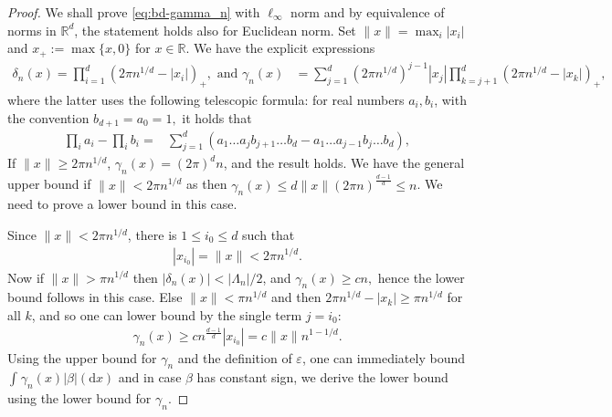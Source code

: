 \documentclass[10pt,a4paper]{amsart}
\newcommand{\R}{\mathbb{R}}
\newcommand{\md}{\mathrm{d}}
\begin{document}
\begin{proof}  {We shall prove \eqref{eq:bd-gamma_n} with $\ell_{\infty}$ norm and by equivalence of norms in $\R^d$, the statement holds also for Euclidean norm. Set $ \|x\| = \max_{i} | x_{i} |$ and $x_+  := \max \{x,0\}$ for $x \in \R$.}
{We have the explicit expressions
%
\begin{align*}
\delta _{n}(x)= \prod_{i= 1}^{d}(2\pi n^{1/d}- | x_{i} | )_{+}, \, \, \text{and} \, \, \gamma _{n}(x)&
 = \sum_{j =  1}^{d}(2\pi n^{ 1/d})^{j- 1} | x_{j} |  \prod_{k = j +  1}^{d}(2\pi n^{ 1/d}- | x_{k} | )_+,
\end{align*}
%
where the latter uses the following telescopic formula: for real numbers $ a_{i},b_{i}$, with the convention $ b_{d +  1} = a_{0} =  1, $ it holds that
%
\begin{align*}  \prod_{i}a_{i}-  \prod_{i}b_{i} = &\sum_{j =   1}^{d}(a_{ 1}\dots a_{j}b_{j +  1 }\dots b_{d}-a_{ 1}\dots a_{j- 1 }b_{j}\dots b_{d}),
\end{align*}
%
}If $ \|x\|\geqslant 2\pi n^{ 1/d}$, $ \gamma  _{n}(x) = (2\pi )^{d}n$, and the result holds. We have the general upper bound if $ \|x\|<2\pi n^{ 1/d}$ as then $ \gamma _{n}(x)\leqslant {d}\|x\|(2\pi n)^{\frac{ d- 1}{d}}\leqslant n$. We need to prove a lower bound in this case.

{Since $ \|x\| < 2\pi n^{ 1/d}$, there is} $1 \leqslant i_{0} \leqslant d$ such that
%
\begin{align*}
|x_{i_{0}}|  = \|x\| <2\pi n^{ 1/d}.
\end{align*}
%
Now if $ \|x\|>\pi n^{ 1/d}$ then $| \delta _{n}(x)| < | \Lambda _{n} | /2$, and $ \gamma _{n}(x)\geqslant cn,$ hence the lower bound follows in this case.
Else $ \|x\|< \pi n^{ 1/d}$ and then $ 2\pi n^{ 1/d}- | x_{k} | \geqslant  \pi n^{ 1/d}$ for all $k$, and so one can lower bound by the single term $ j = i_{0}:$
%
\begin{align*}\gamma _{n}(x)\geqslant cn^{\frac{ d- 1}{d}}|x_{i_{0}}| = c\|x\|n^{ 1- 1/d}.
\end{align*}
%
{Using the upper bound for $\gamma_n$ and the definition of $\varepsilon$, one can immediately bound $\int_{}\gamma _{n}(x)|\beta|(\md x)$ and in case $\beta$ has constant sign, we derive the lower bound using the lower bound for $\gamma_n$.}
\end{proof}
\end{document}
